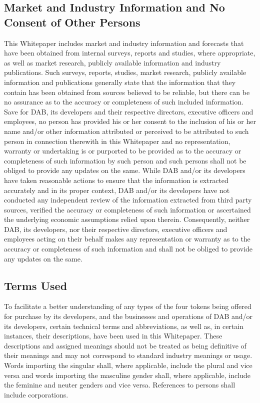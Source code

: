 \documentclass[review]{elsarticle}
\begin{document}
\subsection{Market and Industry Information and No Consent of Other Persons}
This Whitepaper includes market and industry information and forecasts that have been obtained from internal surveys, reports and studies, where appropriate, as well as market research, publicly available information and industry publications. Such surveys, reports, studies, market research, publicly available information and publications generally state that the information that they contain has been obtained from sources believed to be reliable, but there can be no assurance as to the accuracy or completeness of such included information. 
Save for DAB, its developers and their respective directors, executive officers and employees, no person has provided his or her consent to the inclusion of his or her name and/or other information attributed or perceived to be attributed to such person in connection therewith in this Whitepaper and no representation, warranty or undertaking is or purported to be provided as to the accuracy or completeness of such information by such person and such persons shall not be obliged to provide any updates on the same. 
While DAB and/or its developers have taken reasonable actions to ensure that the information is extracted accurately and in its proper context, DAB and/or its developers have not conducted any independent review of the information extracted from third party sources, verified the accuracy or completeness of such information or ascertained the underlying economic assumptions relied upon therein. Consequently, neither DAB, its developers, nor their respective directors, executive officers and employees acting on their behalf makes any representation or warranty as to the accuracy or completeness of such information and shall not be obliged to provide any updates on the same. 

\subsection{Terms Used}
To facilitate a better understanding of any types of the four tokens being offered for purchase by its developers, and the businesses and operations of DAB and/or its developers, certain technical terms and abbreviations, as well as, in certain instances, their descriptions, have been used in this Whitepaper. These descriptions and assigned meanings should not be treated as being definitive of their meanings and may not correspond to standard industry meanings or usage. 
Words importing the singular shall, where applicable, include the plural and vice versa and words importing the masculine gender shall, where applicable, include the feminine and neuter genders and vice versa. References to persons shall include corporations. 
\end{document}
